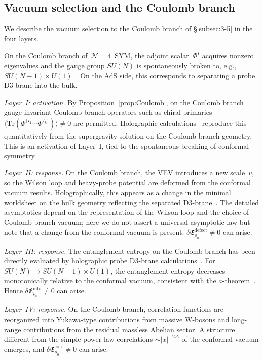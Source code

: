\documentclass[
  aps,
  prd,
  preprint,
  groupedaddress,
  nofootinbib,
  longbibliography
]{revtex4-2}
\theoremstyle{remark}
\newcommand{\N}{\mathcal{N}}
\begin{document}
\subsection{Vacuum selection and the Coulomb branch}%
  \label{subsec:7-4}

We describe the vacuum selection to the Coulomb branch
of \S\ref{subsec:3-5} in the four layers.

On the Coulomb branch of~$\N=4$~SYM, the adjoint
scalar~$\Phi^I$ acquires nonzero eigenvalues and the gauge
group $SU(N)$ is spontaneously broken to, e.g.,
$SU(N-1)\times U(1)$~\cite{ref4,ref6,ref7}.
On the AdS side, this corresponds to separating a probe
D3-brane into the bulk.

\emph{Layer~I: activation.}
By Proposition~\ref{prop:Coulomb}, on the Coulomb branch
gauge-invariant Coulomb-branch operators such as chiral
primaries
$\langle\mathrm{Tr}(\Phi^{(I_1}\cdots\Phi^{I_k)})
\rangle\neq 0$
are permitted.
Holographic calculations~\cite{ref45} reproduce this
quantitatively from the supergravity solution on the
Coulomb-branch geometry.
This is an activation of Layer~I, tied to the spontaneous
breaking of conformal symmetry.

\emph{Layer~II: response.}
On the Coulomb branch, the VEV introduces a new scale~$v$,
so the Wilson loop and heavy-probe potential are deformed from
the conformal vacuum results.
Holographically, this appears as a change in the minimal
worldsheet on the bulk geometry reflecting the separated
D3-brane~\cite{ref28}.
The detailed asymptotics depend on the representation of the
Wilson loop and the choice of Coulomb-branch vacuum; here we
do not assert a universal asymptotic law but note that a change
from the conformal vacuum is present:
$\delta\mathfrak{E}_{\rho_0}^{\mathrm{defect}}\neq 0$
can arise.

\emph{Layer~III: response.}
The entanglement entropy on the Coulomb branch has been directly
evaluated by holographic probe D3-brane
calculations~\cite{ref41}.
For $SU(N)\to SU(N-1)\times U(1)$, the entanglement entropy
decreases monotonically relative to the conformal vacuum,
consistent with the $a$-theorem~\cite{ref41}.
Hence
$\delta\mathfrak{E}_{\rho_0}^{\mathrm{info}}\neq 0$
can arise.

\emph{Layer~IV: response.}
On the Coulomb branch, correlation functions are reorganized
into Yukawa-type contributions from massive W-bosons and
long-range contributions from the residual massless Abelian
sector.
A structure different from the simple power-law correlations
$\sim|x|^{-2\Delta}$ of the conformal vacuum emerges, and
$\delta\mathfrak{E}_{\rho_0}^{\mathrm{corr}}\neq 0$
can arise.
\end{document}
